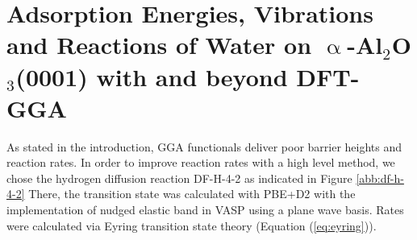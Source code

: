 \documentclass[11pt,DIV=13,BCOR=5mm,a4paper,headinclude]{scrbook}
\begin{document}
\section[Adsorption Energies, Vibrations and Reactions of Water on $\upalpha$-Al$_2$O$_3$(0001)]{Adsorption Energies, Vibrations and Reactions of Water on $\upalpha$-Al$_2$O$_3$(0001) with and beyond DFT-GGA}\label{crystal_calc}
As stated in the introduction, GGA functionals deliver poor barrier heights and reaction rates.
In order to improve reaction rates with a high level method, we chose the hydrogen diffusion reaction DF-H-4-2 as indicated in Figure \ref{abb:df-h-4-2}
There, the transition state was calculated with PBE+D2 with the implementation of nudged elastic band in VASP using a plane wave basis.
Rates were calculated via Eyring transition state theory (Equation (\ref{eq:eyring})).

\end{document}

